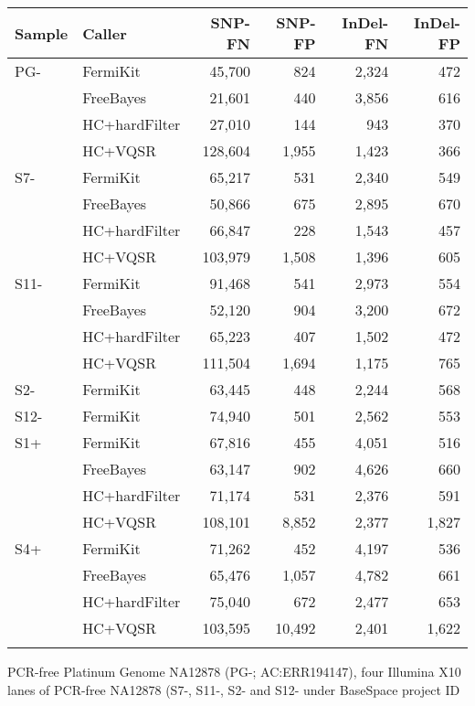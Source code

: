 \documentclass{bioinfo}
\begin{document}
\begin{table}[t]
{\footnotesize
\begin{tabular}{lp{1.7cm}rrrr}
\toprule
Sample & Caller     & SNP-FN & SNP-FP & InDel-FN & InDel-FP \\
\midrule
PG- & FermiKit      & 45,700 & 824    & 2,324    & 472 \\
	& FreeBayes     & 21,601 & 440    & 3,856    & 616 \\
    & HC+hardFilter & 27,010 & 144    & 943      & 370 \\
	& HC+VQSR       & 128,604& 1,955  & 1,423    & 366 \\
S7- & FermiKit      & 65,217 & 531    & 2,340    & 549 \\
	& FreeBayes     & 50,866 & 675    & 2,895    & 670 \\
    & HC+hardFilter & 66,847 & 228    & 1,543    & 457 \\
	& HC+VQSR       & 103,979& 1,508  & 1,396    & 605 \\
S11-& FermiKit      & 91,468 & 541    & 2,973    & 554 \\
	& FreeBayes     & 52,120 & 904    & 3,200    & 672 \\
	& HC+hardFilter & 65,223 & 407    & 1,502    & 472 \\
	& HC+VQSR       & 111,504& 1,694  & 1,175    & 765 \\
S2- & FermiKit      & 63,445 & 448    & 2,244    & 568 \\
S12-& FermiKit      & 74,940 & 501    & 2,562    & 553 \\
S1+ & FermiKit      & 67,816 & 455    & 4,051    & 516 \\
	& FreeBayes     & 63,147 & 902    & 4,626    & 660 \\
    & HC+hardFilter & 71,174 & 531    & 2,376    & 591 \\
	& HC+VQSR       & 108,101& 8,852  & 2,377    & 1,827 \\
S4+ & FermiKit      & 71,262 & 452    & 4,197    & 536 \\
	& FreeBayes     & 65,476 & 1,057  & 4,782    & 661 \\
	& HC+hardFilter & 75,040 & 672    & 2,477    & 653 \\
	& HC+VQSR       & 103,595& 10,492 & 2,401    & 1,622 \\
\botrule
\end{tabular}}{PCR-free Platinum Genome NA12878 (PG-; AC:ERR194147), four Illumina X10 lanes
of PCR-free NA12878 (S7-, S11-, S2- and S12- under BaseSpace project ID
}
\end{table}
\end{document}
